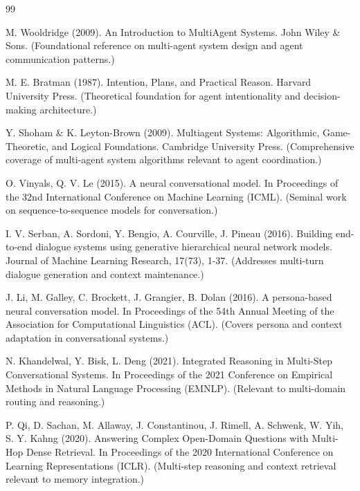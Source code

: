 \documentclass[oneside,a4paper,12pt]{report}
\begin{document}
\begin{thebibliography}{99}

 M. Wooldridge (2009). An Introduction to MultiAgent Systems. John Wiley \& Sons. (Foundational reference on multi-agent system design and agent communication patterns.)
\vspace{2mm}

 M. E. Bratman (1987). Intention, Plans, and Practical Reason. Harvard University Press. (Theoretical foundation for agent intentionality and decision-making architecture.)
\vspace{2mm}

 Y. Shoham \& K. Leyton-Brown (2009). Multiagent Systems: Algorithmic, Game-Theoretic, and Logical Foundations. Cambridge University Press. (Comprehensive coverage of multi-agent system algorithms relevant to agent coordination.)
\vspace{2mm}

 O. Vinyals, Q. V. Le (2015). A neural conversational model. In Proceedings of the 32nd International Conference on Machine Learning (ICML). (Seminal work on sequence-to-sequence models for conversation.)
\vspace{2mm}

 I. V. Serban, A. Sordoni, Y. Bengio, A. Courville, J. Pineau (2016). Building end-to-end dialogue systems using generative hierarchical neural network models. Journal of Machine Learning Research, 17(73), 1-37. (Addresses multi-turn dialogue generation and context maintenance.)
\vspace{2mm}

 J. Li, M. Galley, C. Brockett, J. Grangier, B. Dolan (2016). A persona-based neural conversation model. In Proceedings of the 54th Annual Meeting of the Association for Computational Linguistics (ACL). (Covers persona and context adaptation in conversational systems.)
\vspace{2mm}

 N. Khandelwal, Y. Bisk, L. Deng (2021). Integrated Reasoning in Multi-Step Conversational Systems. In Proceedings of the 2021 Conference on Empirical Methods in Natural Language Processing (EMNLP). (Relevant to multi-domain routing and reasoning.)
\vspace{2mm}

 P. Qi, D. Sachan, M. Allaway, J. Constantinou, J. Rimell, A. Schwenk, W. Yih, S. Y. Kahng (2020). Answering Complex Open-Domain Questions with Multi-Hop Dense Retrieval. In Proceedings of the 2020 International Conference on Learning Representations (ICLR). (Multi-step reasoning and context retrieval relevant to memory integration.)
\vspace{2mm}


\end{thebibliography}
\end{document}
